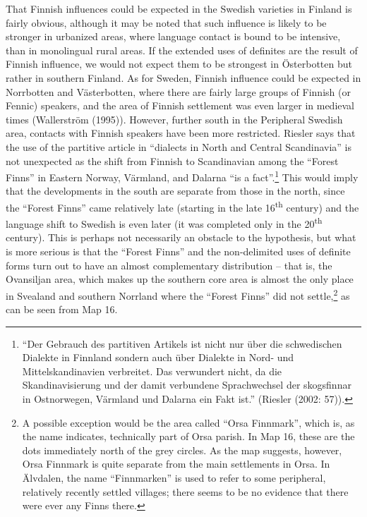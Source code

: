 That Finnish influences could be expected in the Swedish varieties in Finland is fairly obvious, although it may be noted that such influence is likely to be stronger in urbanized areas, where language contact is bound to be intensive, than in monolingual rural areas. If the extended uses of definites are the result of Finnish influence, we would not expect them to be strongest in Österbotten but rather in southern Finland. As for Sweden, Finnish influence could be expected in Norrbotten and Västerbotten, where there are fairly large groups of Finnish (or Fennic) speakers, and the area of Finnish settlement was even larger in medieval times (Wallerström (1995)). However, further south in the Peripheral Swedish area, contacts with Finnish speakers have been more restricted. Riesler says that the use of the partitive article in “dialects in North and Central Scandinavia” is not unexpected as the shift from Finnish to Scandinavian among the “Forest Finns” in Eastern Norway, Värmland, and Dalarna “is a fact”.\footnote{ “Der Gebrauch des partitiven Artikels ist nicht nur über die schwedischen Dialekte in Finnland sondern auch über Dialekte in Nord- und Mittelskandinavien verbreitet. Das verwundert nicht, da die Skandinavisierung und der damit verbundene Sprachwechsel der skogsfinnar in Ostnorwegen, Värmland und Dalarna ein Fakt ist.” (Riesler (2002: 57)). } This would imply that the developments in the south are separate from those in the north, since the “Forest Finns” came relatively late (starting in the late 16\textsuperscript{th }century) and the language shift to Swedish is even later (it was completed only in the 20\textsuperscript{th} century). This is perhaps not necessarily an obstacle to the hypothesis, but what is more serious is that the “Forest Finns” and the non-delimited uses of definite forms turn out to have an almost complementary distribution – that is, the Ovansiljan area, which makes up the southern core area is almost the only place in Svealand and southern Norrland where the “Forest Finns” did not settle,\footnote{ A possible exception would be the area called “Orsa Finnmark”, which is, as the name indicates, technically part of Orsa parish. In Map 16, these are the dots immediately north of the grey circles. As the map suggests, however, Orsa Finnmark is quite separate from the main settlements in Orsa. In Älvdalen, the name “Finnmarken” is used to refer to some peripheral, relatively recently settled villages; there seems to be no evidence that there were ever any Finns there. } as can be seen from Map 16.

